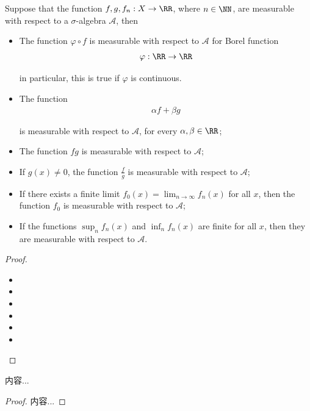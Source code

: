 \documentclass[Total.tex]{subfiles}
\begin{document}
			\begin{proposition}
				Suppose that the function $f,g,f_n:X\rightarrow \RR$, where $n\in \NN$, are measurable with respect to a $\sigma$-algebra $\mathcal{A}$, then
				\begin{itemize}
					\item The function $\varphi\circ f$ is measurable with respect to $\mathcal{A}$ for Borel function
					\begin{gather*}
						\varphi:\RR\rightarrow \RR
					\end{gather*}
					
					in particular, this is true if $\varphi$ is continuous. 
					\item The function
					\begin{gather*}
						\alpha f+\beta g
					\end{gather*}
					
					is measurable with respect to $\mathcal{A}$, for every $\alpha,\beta\in \RR$;
					\item The function $fg$ is measurable with respect to $\mathcal{A}$;
					\item If $g(x)\not=0$, the function $\frac{f}{g}$ is measurable with respect to $\mathcal{A}$;
					\item If there exists a finite limit $f_0(x)=\lim_{n\rightarrow \infty} f_n(x)$ for all $x$, then the function $f_0$ is measurable with respect to $\mathcal{A}$;
					\item If the functions $\sup_n f_n(x)$ and $\inf_n f_n(x)$ are finite for all $x$, then they are measurable with respect to $\mathcal{A}$. 
				\end{itemize}
			\end{proposition}
			\begin{proof}
				\begin{itemize}
					\item 
					\item 
					\item 
					\item 
					\item 
					\item 
				\end{itemize}
			\end{proof}
			
			\begin{proposition}
				内容...
			\end{proposition}
			\begin{proof}
				内容...
			\end{proof}
			
\end{document}

